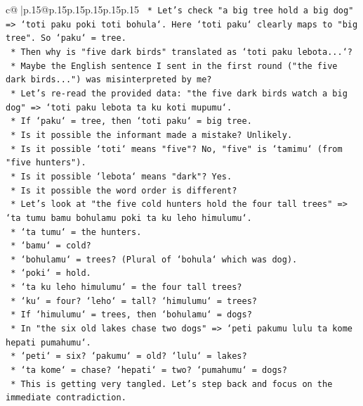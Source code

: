 \documentclass{article}
\begin{document}
{\begin{supertabular}{c@{$\;$}|p{.15\linewidth}@{}p{.15\linewidth}p{.15\linewidth}p{.15\linewidth}p{.15\linewidth}p{.15\linewidth}}
{{{\texttt{        *   Let's check "a big tree hold a big dog" => `toti paku poki toti bohula`. Here `toti paku` clearly maps to "big tree". So `paku` = tree.} \\
\texttt{        *   Then why is "five dark birds" translated as `toti paku lebota...`?} \\
\texttt{        *   Maybe the English sentence I sent in the first round ("the five dark birds...") was misinterpreted by me?} \\
\texttt{        *   Let's re{-}read the provided data: "the five dark birds watch a big dog" => `toti paku lebota ta ku koti mupumu`.} \\
\texttt{        *   If `paku` = tree, then `toti paku` = big tree.} \\
\texttt{        *   Is it possible the informant made a mistake? Unlikely.} \\
\texttt{        *   Is it possible `toti` means "five"? No, "five" is `tamimu` (from "five hunters").} \\
\texttt{        *   Is it possible `lebota` means "dark"? Yes.} \\
\texttt{        *   Is it possible the word order is different?} \\
\texttt{        *   Let's look at "the five cold hunters hold the four tall trees" => `ta tumu bamu bohulamu poki ta ku leho himulumu`.} \\
\texttt{            *   `ta tumu` = the hunters.} \\
\texttt{            *   `bamu` = cold?} \\
\texttt{            *   `bohulamu` = trees? (Plural of `bohula` which was dog).} \\
\texttt{            *   `poki` = hold.} \\
\texttt{            *   `ta ku leho himulumu` = the four tall trees?} \\
\texttt{            *   `ku` = four? `leho` = tall? `himulumu` = trees?} \\
\texttt{            *   If `himulumu` = trees, then `bohulamu` = dogs?} \\
\texttt{            *   In "the six old lakes chase two dogs" => `peti pakumu lulu ta kome hepati pumahumu`.} \\
\texttt{                *   `peti` = six? `pakumu` = old? `lulu` = lakes?} \\
\texttt{                *   `ta kome` = chase? `hepati` = two? `pumahumu` = dogs?} \\
\texttt{            *   This is getting very tangled. Let's step back and focus on the immediate contradiction.} \\
}}}
\end{supertabular}}
\end{document}

